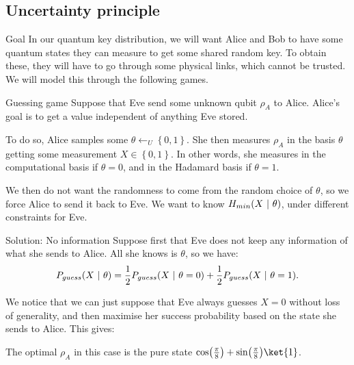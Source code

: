 \documentclass[a4paper]{article}
\begin{document}
\subsection{Uncertainty principle}

\begin{parag}{Goal}
    In our quantum key distribution, we will want Alice and Bob to have some quantum states they can measure to get some shared random key. To obtain these, they will have to go through some physical links, which cannot be trusted. We will model this through the following games.
\end{parag}

\begin{parag}{Guessing game}
    Suppose that Eve send some unknown qubit $\rho_A$ to Alice. Alice's goal is to get a value independent of anything Eve stored.

    To do so, Alice samples some $\theta \leftarrow_U \left\{0, 1\right\}$. She then measures $\rho_A$ in the basis $\theta$ getting some measurement $X \in \left\{0, 1\right\}$. In other words, she measures in the computational basis if $\theta = 0$, and in the Hadamard basis if $\theta =1$. 

    We then do not want the randomness to come from the random choice of $\theta$, so we force Alice to send it back to Eve. We want to know $H_{min}\left(X \suchthat \theta\right)$, under different constraints for Eve.

    \begin{subparag}{Solution: No information}
        Suppose first that Eve does not keep any information of what she sends to Alice. All she knows is $\theta$, so we have: 
        \[P_{guess}\left(X \suchthat \theta\right) = \frac{1}{2} P_{guess}\left(X \suchthat \theta = 0\right) + \frac{1}{2} P_{guess}\left(X \suchthat \theta = 1\right).\]
        
        We notice that we can just suppose that Eve always guesses $X = 0$ without loss of generality, and then maximise her success probability based on the state she sends to Alice. This gives:

        The optimal $\rho_A$ in this case is the pure state $\cos\left(\frac{\pi}{8}\right) + \sin\left(\frac{\pi}{8}\right) \ket{1}$.
    \end{subparag}


\end{parag}
\end{document}
